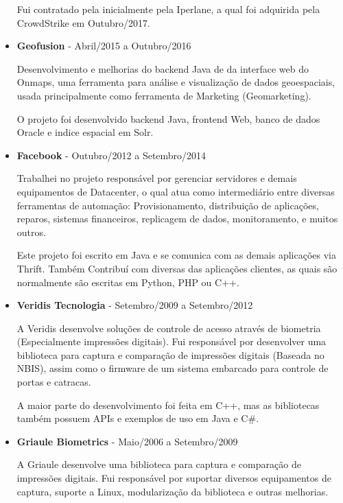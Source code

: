 \documentclass[a4paper,10pt]{article}
\begin{document}
\begin{itemize}
        Fui contratado pela inicialmente pela Iperlane, a qual foi adquirida pela CrowdStrike em Outubro/2017.

      \item
        \textbf{Geofusion} - Abril/2015 a Outubro/2016

        Desenvolvimento e melhorias do backend Java de da interface web do Onmaps, uma ferramenta para análise e visualização de dados geoespaciais, usada principalmente como ferramenta de Marketing (Geomarketing).
        
        O projeto foi desenvolvido backend Java, frontend Web, banco de dados Oracle e indice espacial em Solr.

      \item
        \textbf{Facebook} - Outubro/2012 a Setembro/2014
        
        Trabalhei no projeto responsável por gerenciar servidores e demais equipamentos de Datacenter, o qual atua como intermediário entre diversas ferramentas de automação: Provisionamento, distribuição de aplicações, reparos, sistemas financeiros, replicagem de dados, monitoramento, e muitos outros.
        
        Este projeto foi escrito em Java e se comunica com as demais aplicações via Thrift. Também Contribuí com diversas das aplicações clientes, as quais são normalmente são escritas em Python, PHP ou C++.

      \item
        \textbf{Veridis Tecnologia} - Setembro/2009 a Setembro/2012

        A Veridis desenvolve soluções de controle de acesso através de biometria (Especialmente impressões digitais). Fui responsável por desenvolver uma biblioteca para captura e comparação de impressões digitais (Baseada no NBIS), assim como o firmware de um sistema embarcado para controle de portas e catracas.
        
        A maior parte do desenvolvimento foi feita em C++, mas as bibliotecas também possuem APIs e exemplos de uso em Java e C\#.

      \item
        \textbf{Griaule Biometrics} - Maio/2006 a Setembro/2009
        
        A Griaule desenvolve uma biblioteca para captura e comparação de impressões digitais. Fui responsável por suportar diversos equipamentos de captura, suporte a Linux, modularização da biblioteca e outras melhorias.
        

\end{itemize}
\end{document}
